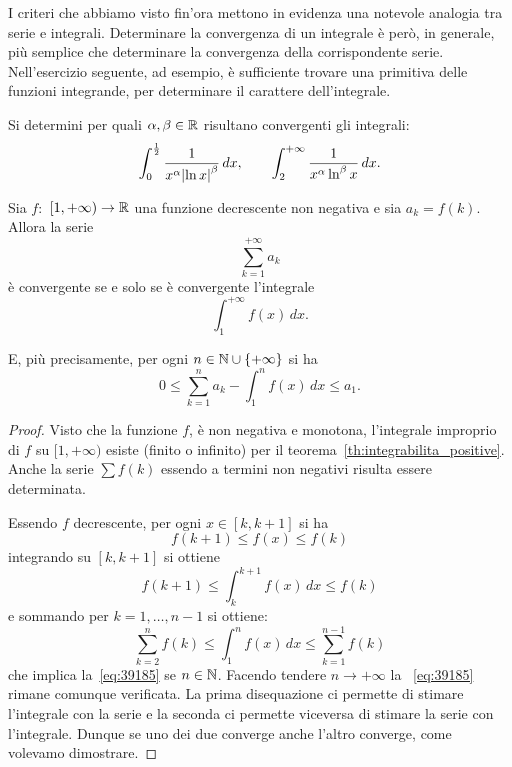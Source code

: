 I criteri che abbiamo visto fin'ora mettono in evidenza una notevole
analogia tra serie e integrali. Determinare la convergenza
di un integrale è però, in generale, più semplice che determinare
la convergenza della corrispondente serie.
Nell'esercizio seguente, ad esempio, è sufficiente trovare una primitiva
delle funzioni integrande, per determinare il carattere dell'integrale.

\begin{exercise}
Si determini per quali $\alpha,\beta\in {\mathbb R}$ risultano convergenti
gli integrali:
\[
  \int_0^{\frac 1 2} \frac{1}{x^\alpha {\left|\ln x\right|}^\beta}\, dx,
  \qquad
  \int_2^{+\infty} \frac{1}{x^\alpha \ln^\beta x} \, dx.
\]
\end{exercise}

\begin{theorem}
\mymark{**}
Sia $f\colon$ $[1,+\infty)\to {\mathbb R}$ una funzione decrescente non negativa
e sia $a_k=f(k)$.
Allora la serie
\[
   \sum_{k=1}^{+\infty} a_k
\]
è convergente se e solo se è convergente l'integrale
\[
  \int_1^{+\infty} f(x)\, dx.
\]

E, più precisamente, per ogni $n\in {\mathbb N}\cup{\left\{ +\infty \right\}}$ si ha
\begin{equation}\label{eq:39185}
  0
  \le \sum_{k=1}^{n} a_k - \int_1^{n}f(x)\, dx
  \le a_1.
\end{equation}

\end{theorem}
%
\begin{proof}
\mymark{**}
Visto che la funzione $f$, è non negativa e monotona,
l'integrale improprio di $f$ su $[1,+\infty)$ esiste (finito o infinito)
per il teorema~\ref{th:integrabilita_positive}.
Anche la serie $\sum f(k)$ essendo a termini non negativi risulta essere determinata.

Essendo $f$ decrescente, per ogni $x \in [k,k+1]$ si ha
\[
  f(k+1) \le f(x) \le f(k)
\]
integrando su $[k,k+1]$ si ottiene
\[
  f(k+1) \le \int_{k}^{k+1} f(x)\, dx \le f(k)
\]
e sommando per $k=1,\dots, n-1$ si ottiene:
\[
  \sum_{k=2}^{n} f(k) \le \int_{1}^{n} f(x)\, dx \le \sum_{k=1}^{n-1} f(k)
\]
che implica la~\eqref{eq:39185} se $n\in {\mathbb N}$. Facendo
tendere $n\to+\infty$ la ~\eqref{eq:39185} rimane comunque verificata.
La prima disequazione ci permette di stimare l'integrale con la serie
e la seconda ci permette viceversa di stimare la serie con l'integrale.
Dunque se uno dei due converge anche l'altro converge, come volevamo dimostrare.
\end{proof}

